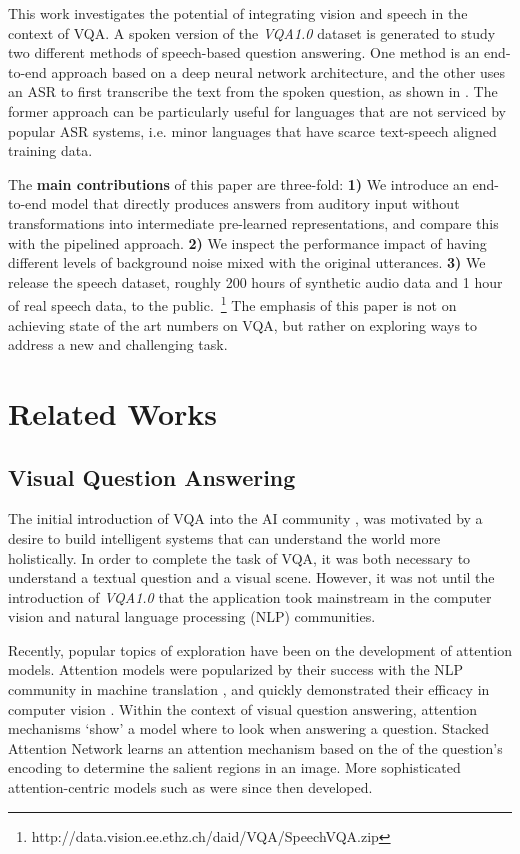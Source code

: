 \documentclass[letterpaper]{article} %
\begin{document}
This work investigates the potential of integrating vision and speech in the context of VQA. A spoken version of the \textit{VQA1.0} dataset is generated to study two different methods of speech-based question answering. One method is an end-to-end approach based on a deep neural network architecture, and the other uses an ASR to first transcribe the text from the spoken question, as shown in . The former approach can be particularly useful for languages that are not serviced by popular ASR systems, i.e. minor languages that have scarce text-speech aligned training data.

The \textbf{main contributions} of this paper are three-fold: \textbf{1)} We introduce an end-to-end model that directly produces answers from auditory input without transformations into intermediate pre-learned representations, and compare this with the pipelined approach. \textbf{2)} We inspect the performance impact of having different levels of background noise mixed with the original utterances. \textbf{3)} We release the speech dataset, roughly 200 hours of synthetic audio data and 1 hour of real speech data, to the public.~\footnote{http://data.vision.ee.ethz.ch/daid/VQA/SpeechVQA.zip} The emphasis of this paper is not on achieving state of the art numbers on VQA, but rather on exploring ways to address a new and challenging task.


\section{Related Works}

\subsection{Visual Question Answering}
The initial introduction of VQA into the AI community \cite{realtime:vqa}, \cite{daquar} was motivated by a desire to build intelligent systems that can understand the world more holistically. In order to complete the task of VQA, it was both necessary to understand a textual question and a visual scene. However, it was not until the introduction of \textit{VQA1.0} \cite{VQA} that the application took mainstream in the computer vision and natural language processing (NLP) communities.

Recently, popular topics of exploration have been on the development of attention models. Attention models were popularized by their success with the NLP community in machine translation \cite{nmt:joint:align}, and quickly demonstrated their efficacy in computer vision \cite{recurrent:visual:attn}. Within the context of visual question answering, attention mechanisms `show' a model where to look when answering a question. Stacked Attention Network \cite{vqa:stackedattn} learns an attention mechanism based on the of the question's encoding to determine the salient regions in an image. More sophisticated attention-centric models such as \cite{vqa:dualattn,vqa:hieco,vqa:dynamicmemory} were since then developed.
\end{document}
